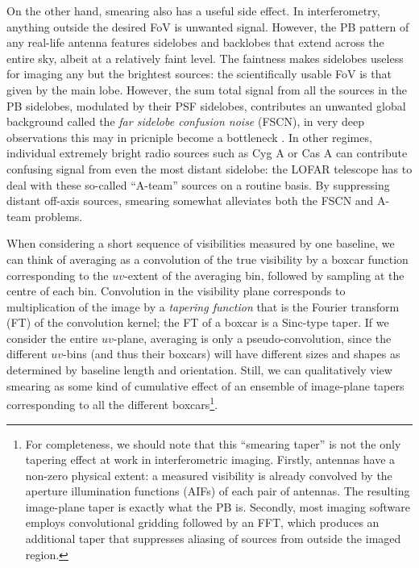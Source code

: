 \documentclass[useAMS,usenatbib]{mn2e}
\begin{document}
On the other hand, smearing also has a useful side effect. In interferometry, anything outside the desired FoV is unwanted 
signal. However, the PB pattern of any real-life antenna features sidelobes and backlobes 
that extend across the entire sky, albeit at a relatively faint level. The faintness makes sidelobes useless for imaging any 
but the brightest sources: the scientifically usable FoV is that given by the main lobe. However, the 
sum total signal from all the sources in the PB sidelobes, modulated by their PSF sidelobes, contributes an unwanted global 
background called the \emph{far sidelobe confusion noise} (FSCN), in very deep observations this may in pricniple become a
bottleneck \citep{icea-fscn}. In other regimes, individual extremely bright radio sources such as Cyg A or 
Cas A can contribute confusing signal from even the most distant  sidelobe: the LOFAR telescope \citep{LOFAR} has to deal 
with these so-called ``A-team'' sources 
on a routine basis. By suppressing distant off-axis sources, smearing somewhat alleviates both the FSCN and A-team problems.

When considering a short sequence of visibilities measured by one baseline, we can think of averaging as a convolution of the 
true visibility by a boxcar function corresponding to the $uv$-extent of the averaging bin, followed by sampling at the 
centre of each bin. Convolution in the visibility plane corresponds to multiplication of the image by a \emph{tapering function} 
that is the Fourier transform (FT) of the convolution kernel; the FT of a boxcar is a Sinc-type taper. If
we consider the entire $uv$-plane, averaging is only a pseudo-convolution, since the different $uv$-bins (and thus
their boxcars) will have different sizes and shapes as determined by baseline length and orientation. Still, we can 
qualitatively view smearing  as some kind of cumulative effect of an ensemble of image-plane tapers corresponding to all the 
different boxcars\footnote{For completeness, we should note that  this ``smearing taper'' is not the only tapering effect 
at work in interferometric imaging. Firstly, antennas have a non-zero 
physical extent: a measured visibility is already convolved by the aperture illumination functions (AIFs) of each pair of 
antennas. The resulting image-plane taper is exactly what the PB is. Secondly, most imaging software employs 
convolutional gridding followed by an FFT, which produces an additional taper that suppresses aliasing of sources from 
outside the imaged region.}. 
\end{document}
